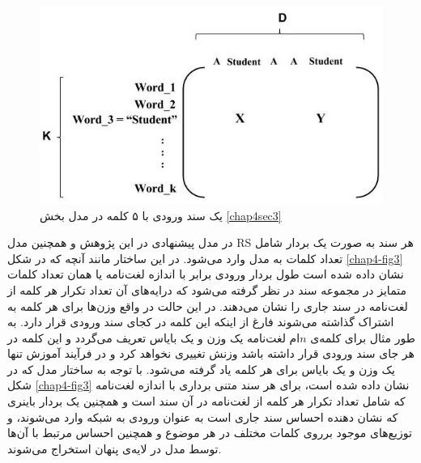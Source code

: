 \begin{figure}[!t]
	\centering
	\includegraphics[scale=0.4]{chap4-img/example}
	\caption{یک سند ورودی با ۵ کلمه در مدل بخش \ref{chap4sec3}}
	\label{chap4-fig4}
\end{figure}

در مدل پیشنهادی در این پژوهش و همچنین مدل
RS
هر سند به صورت یک بردار شامل تعداد کلمات به مدل وارد می‌‌شود. در این ساختار مانند آنچه که در شکل
\ref{chap4-fig3}
نشان داده شده است طول بردار ورودی برابر با اندازه لغت‌نامه یا همان تعداد کلمات متمایز در مجموعه سند در نظر گرفته می‌‌شود که درایه‌های آن تعداد تکرار هر کلمه از لغت‌نامه در سند جاری را نشان می‌‌دهند. در این حالت در واقع وزن‌ها برای هر کلمه به اشتراک گذاشته می‌‌شوند فارغ از اینکه این کلمه در کجای سند ورودی قرار دارد. به طور مثال برای کلمه‌ی‌
$n$ام 
لغت‌نامه یک وزن و یک بایاس تعریف می‌‌گردد و این کلمه در هر جای سند ورودی قرار داشته باشد وزنش تغییری نخواهد کرد و در فرآیند آموزش تنها یک وزن و یک بایاس برای هر کلمه یاد گرفته می‌‌شود. با توجه به ساختار مدل که در شکل
\ref{chap4-fig3}
نشان داده شده است، برای هر سند متنی برداری با اندازه لغت‌نامه که شامل تعداد تکرار هر کلمه از لغت‌نامه در آن سند است و همچنین یک بردار باینری که نشان دهنده احساس سند جاری است به عنوان ورودی به شبکه وارد می‌‌شوند، و توزیع‌های موجود برروی کلمات مختلف در هر موضوع و همچنین احساس مرتبط با آن‌ها توسط مدل در لایه‌‌ی پنهان استخراج می‌‌شوند.

